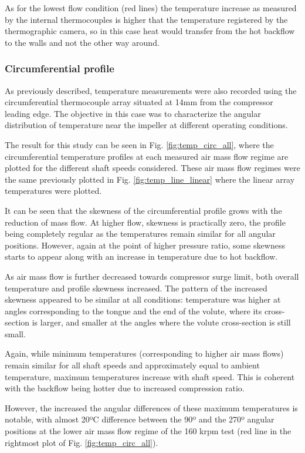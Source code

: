 As for the lowest flow condition (red lines) the temperature increase as measured by the internal thermocouples is higher that the temperature registered by the thermographic camera, so in this case heat would transfer from the hot backflow to the walls and not the other way around.

\subsubsection{Circumferential profile}

As previously described, temperature measurements were also recorded using the circumferential thermocouple array situated at 14mm from the compressor leading edge. The objective in this case was to characterize the angular distribution of temperature near the impeller at different operating conditions.

The result for this study can be seen in Fig. \ref{fig:temp_circ_all}, where the circumferential temperature profiles at each measured air mass flow regime are plotted for the different shaft speeds considered. These air mass flow regimes were the same previously plotted in Fig. \ref{fig:temp_line_linear} where the linear array temperatures were plotted.

It can be seen that the skewness of the circumferential profile grows with the reduction of mass flow. At higher flow, skewness is practically zero, the profile being completely regular as the temperatures remain similar for all angular positions. However, again at the point of higher pressure ratio, some skewness starts to appear along with an increase in temperature due to hot backflow.

As air mass flow is further decreased towards compressor surge limit, both overall temperature and profile skewness increased. The pattern of the increased skewness appeared to be similar at all conditions: temperature was higher at angles corresponding to the tongue and the end of the volute, where its cross-section is larger, and smaller at the angles where the volute cross-section is still small.

Again, while minimum temperatures (corresponding to higher air mass flows) remain similar for all shaft speeds and approximately equal to ambient temperature, maximum temperatures increase with shaft speed. This is coherent with the backflow being hotter due to increased compression ratio.

However, the increased the angular differences of these maximum temperatures is notable, with almost 20ºC difference between the 90º and the 270º angular positions at the lower air mass flow regime of the 160 krpm test (red line in the rightmost plot of Fig. \ref{fig:temp_circ_all}).

